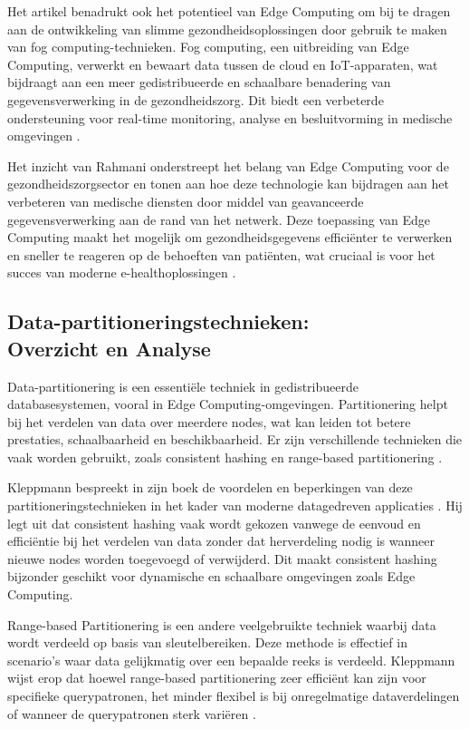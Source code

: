 Het artikel benadrukt ook het potentieel van Edge Computing om bij te dragen aan de ontwikkeling van slimme gezondheidsoplossingen door gebruik te maken van fog computing-technieken. 
 Fog computing, een uitbreiding van Edge Computing, verwerkt en bewaart data tussen de cloud en IoT-apparaten, wat bijdraagt aan een meer gedistribueerde en schaalbare benadering van gegevensverwerking in de gezondheidszorg.
Dit biedt een verbeterde ondersteuning voor real-time monitoring, analyse en besluitvorming in medische omgevingen \autocite{Rahmani2018}.
 
Het inzicht van Rahmani onderstreept het belang van Edge Computing voor de gezondheidszorgsector en tonen aan hoe deze technologie kan bijdragen aan het verbeteren van medische diensten door middel van geavanceerde gegevensverwerking aan de rand van het netwerk.
 Deze toepassing van Edge Computing maakt het mogelijk om gezondheidsgegevens efficiënter te verwerken en sneller te reageren op de behoeften van patiënten, wat cruciaal is voor het succes van moderne e-healthoplossingen \autocite{Rahmani2018}.
 

\subsection{Data-partitioneringstechnieken: \vspace{0em}\\ Overzicht en Analyse}

Data-partitionering is een essentiële techniek in gedistribueerde databasesystemen, vooral in Edge Computing-omgevingen. Partitionering helpt bij het verdelen van data over meerdere nodes, wat kan leiden tot betere prestaties, schaalbaarheid en beschikbaarheid.
 Er zijn verschillende technieken die vaak worden gebruikt, zoals consistent hashing en range-based partitionering \autocite{Karger1997}.

Kleppmann bespreekt in zijn boek de voordelen en beperkingen van deze partitioneringstechnieken in het kader van moderne datagedreven applicaties \autocite{Kleppmann2017}. Hij legt uit dat consistent hashing vaak wordt gekozen vanwege de eenvoud en efficiëntie bij het verdelen van data zonder dat herverdeling nodig is wanneer nieuwe nodes worden toegevoegd of verwijderd.
 Dit maakt consistent hashing bijzonder geschikt voor dynamische en schaalbare omgevingen zoals Edge Computing.

Range-based Partitionering is een andere veelgebruikte techniek waarbij data wordt verdeeld op basis van sleutelbereiken. 
 Deze methode is effectief in scenario's waar data gelijkmatig over een bepaalde reeks is verdeeld.
Kleppmann wijst erop dat hoewel range-based partitionering zeer efficiënt kan zijn voor specifieke querypatronen, het minder flexibel is bij onregelmatige dataverdelingen of wanneer de querypatronen sterk variëren \autocite{Kleppmann2017}.
 
